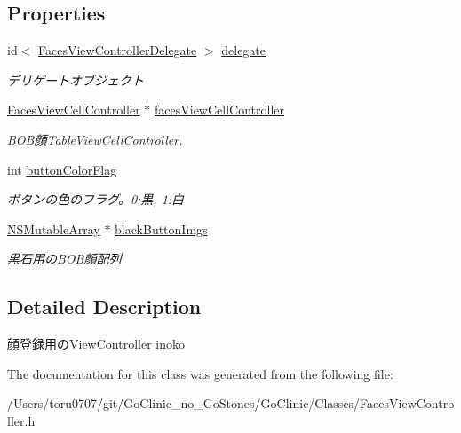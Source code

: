 \subsection*{Properties}
\begin{DoxyCompactItemize}
\item 
\hypertarget{interface_faces_view_controller_ab1fea4872bd265b9d0b81f66180c4efb}{
id$<$ \hyperlink{protocol_faces_view_controller_delegate-p}{FacesViewControllerDelegate} $>$ \hyperlink{interface_faces_view_controller_ab1fea4872bd265b9d0b81f66180c4efb}{delegate}}
\label{interface_faces_view_controller_ab1fea4872bd265b9d0b81f66180c4efb}

\begin{DoxyCompactList}\small\item\em デリゲートオブジェクト \end{DoxyCompactList}\item 
\hypertarget{interface_faces_view_controller_acec47fda1ebf9bc0b55cfd1accec9b34}{
\hyperlink{interface_faces_view_cell_controller}{FacesViewCellController} $\ast$ \hyperlink{interface_faces_view_controller_acec47fda1ebf9bc0b55cfd1accec9b34}{facesViewCellController}}
\label{interface_faces_view_controller_acec47fda1ebf9bc0b55cfd1accec9b34}

\begin{DoxyCompactList}\small\item\em BOB顔TableViewCellController. \end{DoxyCompactList}\item 
\hypertarget{interface_faces_view_controller_a222a418be1973eba31c6211d8e0023e2}{
int \hyperlink{interface_faces_view_controller_a222a418be1973eba31c6211d8e0023e2}{buttonColorFlag}}
\label{interface_faces_view_controller_a222a418be1973eba31c6211d8e0023e2}

\begin{DoxyCompactList}\small\item\em ボタンの色のフラグ。0:黒, 1:白 \end{DoxyCompactList}\item 
\hypertarget{interface_faces_view_controller_ac17c50276b2e991235326ae8ba8e4848}{
\hyperlink{class_n_s_mutable_array}{NSMutableArray} $\ast$ \hyperlink{interface_faces_view_controller_ac17c50276b2e991235326ae8ba8e4848}{blackButtonImgs}}
\label{interface_faces_view_controller_ac17c50276b2e991235326ae8ba8e4848}

\begin{DoxyCompactList}\small\item\em 黒石用のBOB顔配列 \end{DoxyCompactList}\end{DoxyCompactItemize}


\subsection{Detailed Description}
顔登録用のViewController  inoko 

The documentation for this class was generated from the following file:\begin{DoxyCompactItemize}
\item 
/Users/toru0707/git/GoClinic\_\-no\_\-GoStones/GoClinic/Classes/FacesViewController.h\end{DoxyCompactItemize}

